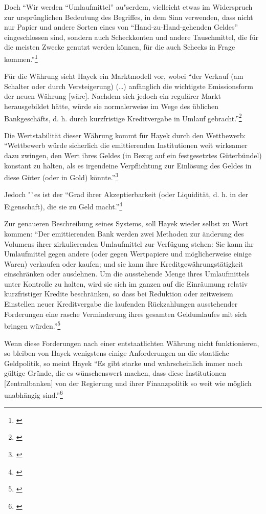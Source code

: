 \documentclass[
        onecolumn,
        a4paper,
        abstracton,
        parskip=half
        ,final
        ]{scrartcl}
\begin{document}
Doch "`Wir werden "`Umlaufmittel"' au{"s}erdem, vielleicht etwas im Widerspruch zur urspr{\"u}nglichen Bedeutung des Begriffes, in dem Sinn verwenden, dass nicht nur Papier und andere Sorten eines von "`Hand-zu-Hand-gehenden Geldes"' eingeschlossen sind, sondern auch Scheckkonten und andere Tauschmittel, die f{\"u}r die meisten Zwecke genutzt werden k{\"o}nnen, f{\"u}r die auch Schecks in Frage kommen."'\footnote[417]{\citep*[S.43]{Hayek1977}}

F{\"u}r die W{\"a}hrung sieht Hayek ein Marktmodell vor, wobei "`der Verkauf (am Schalter oder durch Versteigerung) (\ldots) anf{\"a}nglich die wichtigste Emissionsform der neuen W{\"a}hrung [w{\"a}re]. Nachdem sich jedoch ein regul{\"a}rer Markt herausgebildet h{\"a}tte, w{\"u}rde sie normalerweise im Wege des {\"u}blichen Bankgesch{\"a}fts, d. h. durch kurzfristige Kreditvergabe in Umlauf gebracht."'\footnote[418]{\citep*[S.31]{Hayek1977}}

Die Wertstabilit{\"a}t dieser W{\"a}hrung kommt f{\"u}r Hayek durch den Wettbewerb: "`Wettbewerb w{\"u}rde sicherlich die emittierenden Institutionen weit wirksamer dazu zwingen, den Wert ihres Geldes (in Bezug auf ein festgesetztes G{\"u}terb{\"u}ndel) konstant zu halten, als es irgendeine Verpflichtung zur Einl{\"o}sung des Geldes in diese G{\"u}ter (oder in Gold) k{\"o}nnte."'\footnote[419]{\citep*[S.32]{Hayek1977}}

Jedoch "`es ist der "`Grad ihrer Akzeptierbarkeit (oder Liquidit{\"a}t, d. h. in der Eigenschaft), die sie zu Geld macht."'\footnote[420]{\citep*[S.40]{Hayek1977}}

Zur genaueren Beschreibung seines Systems, soll Hayek wieder selbst zu Wort kommen: "`Der emittierenden Bank werden zwei Methoden zur {\"a}nderung des Volumens ihrer zirkulierenden Umlaufmittel zur Verf{\"u}gung stehen: Sie kann ihr Umlaufmittel gegen andere (oder gegen Wertpapiere und m{\"o}glicherweise einige Waren) verkaufen oder kaufen; und sie kann ihre Kreditgew{\"a}hrungst{\"a}tigkeit einschr{\"a}nken oder ausdehnen. Um die ausstehende Menge ihres Umlaufmittels unter Kontrolle zu halten, wird sie sich im ganzen auf die Einr{\"a}umung relativ kurzfristiger Kredite beschr{\"a}nken, so dass bei Reduktion oder zeitweisem Einstellen neuer Kreditvergabe die laufenden R{\"u}ckzahlungen ausstehender Forderungen eine rasche Verminderung ihres gesamten Geldumlaufes mit sich bringen w{\"u}rden."'\footnote[421]{\citep*[S.45]{Hayek1977}}

Wenn diese Forderungen nach einer entstaatlichten W{\"a}hrung nicht funktionieren, so bleiben von Hayek wenigstens einige Anforderungen an die staatliche Geldpolitik, so meint Hayek
"`Es gibt starke und wahrscheinlich immer noch g{\"u}ltige Gr{\"u}nde, die es w{\"u}nschenswert machen, dass diese Institutionen [Zentralbanken] von der Regierung und ihrer Finanzpolitik so weit wie m{\"o}glich unabh{\"a}ngig sind."'\footnote[422]{\citep*[S.412]{hayek1971}}
\end{document}
